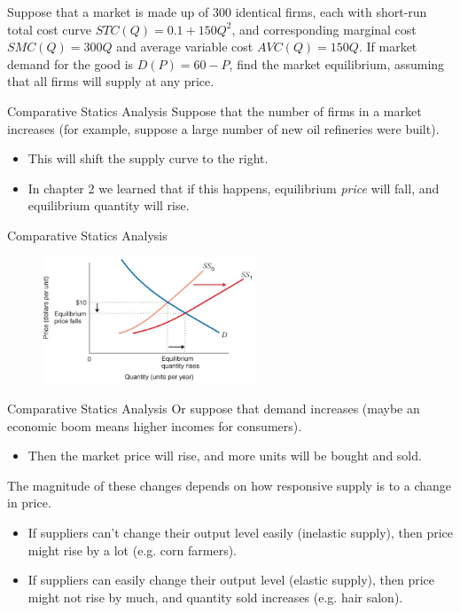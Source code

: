 \documentclass[11pt,t]{beamer}
\begin{document}
\begin{frame}{}
  Suppose that a market is made up of 300 identical firms, each with short-run total cost curve $STC(Q) = 0.1 + 150Q^2$, and corresponding marginal cost $SMC(Q)=300Q$ and average variable cost $AVC(Q)=150Q$. If market demand for the good is $D(P)=60-P$, find the market equilibrium, assuming that all firms will supply at any price.
\end{frame}

\begin{frame}{Comparative Statics Analysis}
  Suppose that the number of firms in a market increases (for example, suppose a large number of new oil refineries were built).

  \begin{itemize}
    \item This will shift the supply curve to the right.
    
    \item In chapter 2 we learned that if this happens, equilibrium \emph{price} will fall, and equilibrium quantity will rise.
  \end{itemize}
\end{frame}

\begin{frame}{Comparative Statics Analysis}
  \begin{figure}
    \includegraphics[width=240px]{figures/fig9_9.jpg}
  \end{figure}
\end{frame}

\begin{frame}{Comparative Statics Analysis}
  Or suppose that demand increases (maybe an economic boom means higher incomes for consumers).

  \begin{itemize}
    \item Then the market price will rise, and more units will be bought and sold.
  \end{itemize}

  \bigskip\pause 
  The magnitude of these changes depends on how responsive supply is to a change in price.

  \begin{itemize}
    \item If suppliers can't change their output level easily (inelastic supply), then price might rise by a lot (e.g. corn farmers).
    
    \item If suppliers can easily change their output level (elastic supply), then price might not rise by much, and quantity sold increases (e.g. hair salon).
  \end{itemize}
\end{frame}
\end{document}
